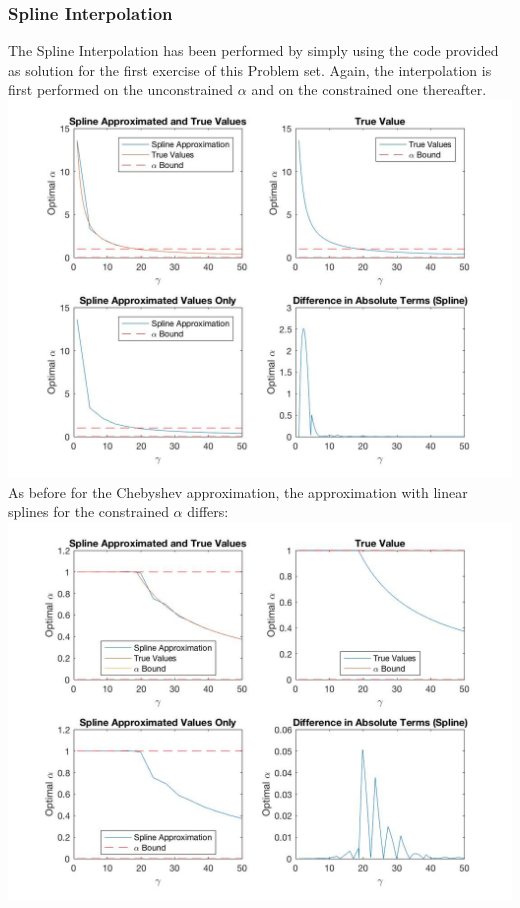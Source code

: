\documentclass{article}
\begin{document}
\subsubsection{Spline Interpolation}
The Spline Interpolation has been performed by simply using the code provided as solution for the first exercise of this Problem set. Again, the interpolation is first performed on the unconstrained $\alpha$ and on the constrained one thereafter. \\
\includegraphics[width = \textwidth, keepaspectratio]{PS4Q3SPLINE.jpg} 
As before for the Chebyshev approximation, the approximation with linear splines for the constrained $\alpha$ differs:\\
\includegraphics[width = \textwidth, keepaspectratio]{PS4Q3SPLINE_constrained.jpg}
\end{document}
